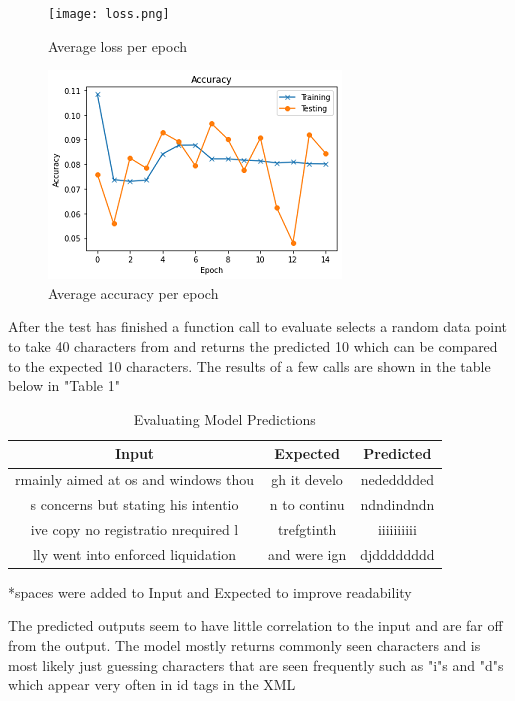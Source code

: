 \documentclass[conference]{IEEEtran}
\begin{document}
\begin{figure}[htbp]
\centerline{\texttt{[image: loss.png]}}
\caption{Average loss per epoch}
\label{fig1}
\end{figure}

\begin{figure}[htbp]
\centerline{\includegraphics{accuracy.png}}
\caption{Average accuracy per epoch}
\label{fig2}
\end{figure}

After the test has finished a function call to evaluate selects a random data point to take 40 characters from and returns the predicted 10 which can be compared to the expected 10 characters. The results of a few calls are shown in the table below in "Table 1"

\begin{table}[htbp]
\caption{Evaluating Model Predictions}
\begin{center}
\begin{tabular}{|c|c|c|}
\hline
\textbf{Input}&\textbf{Expected} & \textbf{Predicted} \\
\hline
rmainly aimed at os and windows thou&gh it develo&nededddded \\
\hline
s concerns but stating his intentio&n to continu&ndndindndn \\
\hline
ive copy no registratio nrequired l & trefgtinth&iiiiiiiiii \\
\hline
lly went into enforced liquidation&and were ign&djdddddddd\\
\hline
\end{tabular}
\label{tab1}
\end{center}
\>*spaces were added to Input and Expected to improve readability
\end{table}

The predicted outputs seem to have little correlation to the input and are far off from the output. The model mostly returns commonly seen characters and is most likely just guessing characters that are seen frequently such as "i"s and "d"s which appear very often in id tags in the XML
\end{document}
